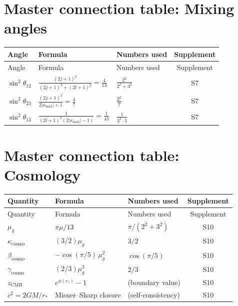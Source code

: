 \documentclass[11pt,letterpaper]{article}
\numberwithin{equation}{section}
\begin{document}
\section{Master connection table: Mixing angles}
\label{sec:mixing}

\begin{longtable}{p{2.5cm}p{5cm}p{3.5cm}c}
\toprule
Angle & Formula & Numbers used & Supplement \\
\midrule
\endfirsthead
\toprule
Angle & Formula & Numbers used & Supplement \\
\midrule
\endhead
$\sin^2\theta_{12}$ & $\frac{(2j+1)^2}{(2j+1)^2+(2l+1)^2} = \frac{4}{13}$ & $\frac{2^2}{2^2+3^2}$ & S7 \\
$\sin^2\theta_{23}$ & $\frac{(2j+1)^2}{2|\kappa_\mathrm{max}|+1} = \frac{4}{7}$ & $\frac{2^2}{7}$ & S7 \\
$\sin^2\theta_{13}$ & $\frac{1}{(2l+1)^2(2|\kappa_\mathrm{max}|-1)} = \frac{1}{45}$ & $\frac{1}{3^2 \cdot 5}$ & S7 \\
\bottomrule
\end{longtable}

\section{Master connection table: Cosmology}
\label{sec:cosmology}

\begin{longtable}{p{3cm}p{5cm}p{3cm}c}
\toprule
Quantity & Formula & Numbers used & Supplement \\
\midrule
\endfirsthead
\toprule
Quantity & Formula & Numbers used & Supplement \\
\midrule
\endhead
$\mu_g$ & $\pi\mu/13$ & $\pi/(2^2+3^2)$ & S10 \\
$\kappa_\mathrm{cosmo}$ & $(3/2)\mu_g$ & $3/2$ & S10 \\
$\beta_\mathrm{cosmo}$ & $-\cos(\pi/5)\,\mu_g^2$ & $\cos(\pi/5)$ & S10 \\
$\gamma_\mathrm{cosmo}$ & $(2/3)\mu_g^3$ & $2/3$ & S10 \\
$z_\mathrm{CMB}$ & $e^{\phi(r_*)}-1$ & (boundary value) & S10 \\
$c^2 = 2GM/r_*$ & Misner--Sharp closure & (self-consistency) & S10 \\
\bottomrule
\end{longtable}
\end{document}
